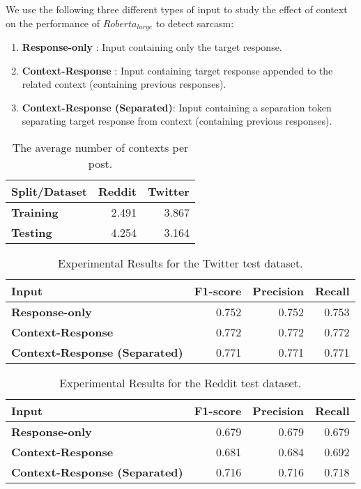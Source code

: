 \documentclass[11pt,a4paper]{article}
\begin{document}
We use the following three different types of input to study the effect of context on the performance of $Roberta_{large}$ to detect sarcasm:
\begin{enumerate}
\item \textbf{Response-only} : Input containing only the target response.
\item \textbf{Context-Response} : Input containing target response appended to the related context (containing previous responses).
\item \textbf{Context-Response (Separated)}: Input containing a separation token separating target response from context (containing previous responses).
\end{enumerate}

\begin{table}[!htbp]
\centering
\begin{tabular}{|l|r|r|}
\hline
\textbf{Split/Dataset} & \textbf{Reddit} & \textbf{Twitter} \\ \hline
\textbf{Training} & 2.491 & 3.867 \\ \hline
\textbf{Testing} & 4.254 & 3.164 \\ \hline
\end{tabular}
\caption{The average number of contexts per post.}
\label{tab:avg-context-len}
\end{table}

\begin{table*}[!htbp]
\centering
\begin{tabular}{|l|r|r|r|}
\hline
\textbf{Input} & \textbf{F1-score} & \textbf{Precision} & \textbf{Recall} \\ \hline
\textbf{Response-only} & 0.752 & 0.752 & 0.753 \\ \hline
\textbf{Context-Response} & 0.772 & 0.772 & 0.772 \\ \hline
\textbf{Context-Response (Separated)} & 0.771 & 0.771 & 0.771 \\ \hline
\end{tabular}
\caption{Experimental Results for the Twitter test dataset.
}
\label{tab:twitter-results}
\end{table*}

\begin{table*}[!htbp]
\centering
\begin{tabular}{|l|r|r|r|}
\hline
\textbf{Input} & \textbf{F1-score} & \textbf{Precision} & \textbf{Recall} \\ \hline
\textbf{Response-only} & 0.679 & 0.679 & 0.679 \\ \hline
\textbf{Context-Response} & 0.681 & 0.684 & 0.692 \\ \hline
\textbf{Context-Response (Separated)} & 0.716 & 0.716 & 0.718 \\ \hline
\end{tabular}
\caption{Experimental Results for the Reddit test dataset.}
\label{tab:reddit-results}
\end{table*}
\end{document}
